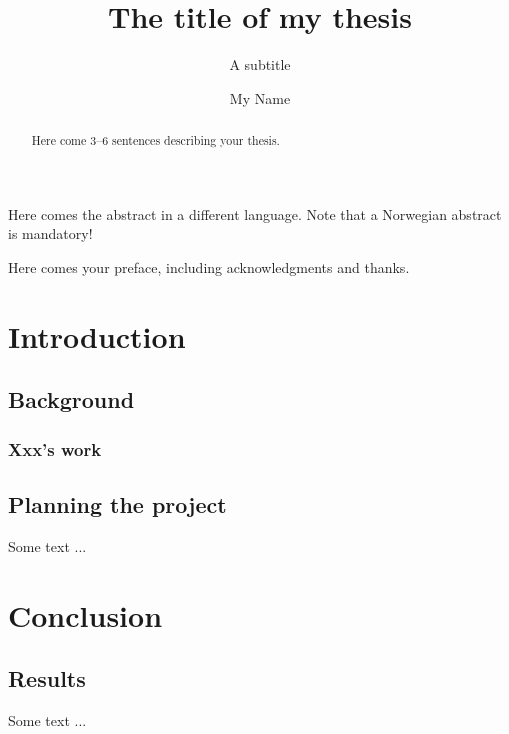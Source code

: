 \documentclass[UKenglish]{uiophdthesis}   %
\title{The title of my thesis}        %
\subtitle{A subtitle}                 %
\author{My Name}                      %
\begin{document}
\frontmatter{}
\maketitle[
  supervisor={A Supervisor},
]

\begin{abstract}
  Here come 3--6 sentences describing your thesis.
\end{abstract}
\begin{xabstract}[Sammendrag]               %
  Here comes the abstract in a different language.
  Note that a Norwegian abstract is mandatory!
\end{xabstract}

\tableofcontents{}                          %
\listoffigures{}                            %
\listoftables{}                             %

\begin{preface}
  Here comes your preface, including acknowledgments and thanks.
\end{preface}

\mainmatter{}
\part*{Introduction}                  %
\chapter{Background}                  %
\section{Xxx's work}                  %

\chapter{Planning the project}        %
Some text ...


\part{Conclusion}                     %
\chapter{Results}                     %
Some text ...

\backmatter{}
\printbibliography{}
\end{document}
